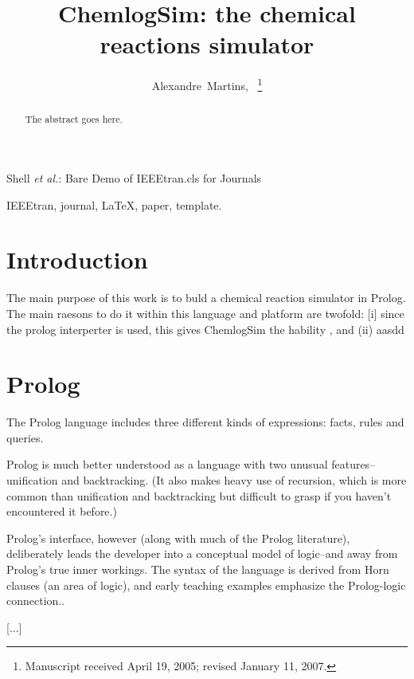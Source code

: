 \documentclass[journal]{IEEEtran}
\begin{document}
\title{ChemlogSim: the chemical reactions simulator }
\author{Alexandre~Martins,~
\thanks{Manuscript received April 19, 2005; revised January 11, 2007.}}

%
{Shell \MakeLowercase{\textit{et al.}}: Bare Demo of IEEEtran.cls for Journals}

\maketitle

\begin{abstract}
The abstract goes here.
\end{abstract}

\begin{IEEEkeywords}
IEEEtran, journal, \LaTeX, paper, template.
\end{IEEEkeywords}

\IEEEpeerreviewmaketitle

\section{Introduction}

The main purpose of this work is to buld a chemical reaction simulator in Prolog.  The main raesons to do it within this language and platform are twofold: [i] since the prolog interperter is used, this gives ChemlogSim the hability ,  and (ii) aasdd

\section{Prolog}
The Prolog language includes three different kinds of expressions: facts, rules and queries.

Prolog is much better understood as a language with two unusual features--unification and backtracking. (It also makes heavy use of recursion, which is more common than unification and backtracking but difficult to grasp if you haven't encountered it before.)

Prolog's interface, however (along with much of the Prolog literature), deliberately leads the developer into a conceptual model of logic--and away from Prolog's true inner workings. The syntax of the language is derived from Horn clauses (an area of logic), and early teaching examples emphasize the Prolog-logic connection.\cite{merritt1992}.

[...]
\end{document}
